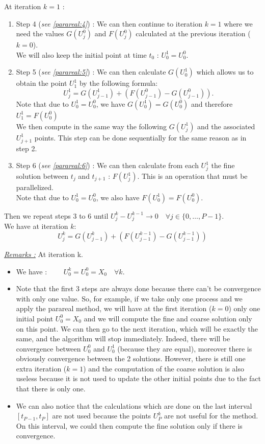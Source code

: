 \noindent At iteration $k=1$ :
\begin{enumerate}[label=\textbullet]	
	\item Step 4 (\textit{see \ref{parareal:4}}) : We can then continue to iteration $k=1$ where we need the values $G(U_j^0)$ and $F(U_j^0)$ calculated at the previous iteration ($k=0$). \\
	We will also keep the initial point at time $t_0$ : $U_0^1=U_0^0$.
	\item Step 5 (\textit{see \ref{parareal:5}}) : We can then calculate $G(U_0^1)$ which allows us to obtain the point $U_1^1$ by the following formula:
	$$U_j^1=G(U_{j-1}^1)+(F(U_{j-1}^0)-G(U_{j-1}^0)).$$
	Note that due to $U_0^1=U_0^0$, we have $G(U_0^1)=G(U_0^0)$ and therefore $U_1^1=F(U_0^0)$ \\
	We then compute in the same way the following $G(U_j^1)$ and the associated $U_{j+1}^1$ points. This step can be done sequentially for the same reason as in step 2.
	\item Step 6 (\textit{see \ref{parareal:6}}) : We can then calculate from each $U_j^1$ the fine solution between $t_j$ and $t_{j+1}$ : $F(U_j^1)$. This is an operation that must be parallelized. \\
	Note that due to $U_0^1=U_0^0$, we also have $F(U_0^1)=F(U_0^0)$.
\end{enumerate}

\noindent Then we repeat steps 3 to 6 until $U_j^k-U_j^{k-1}\rightarrow 0 \quad \forall j\in\{0,\dots,P-1\}$. \\
We have at iteration $k$:
$$U_j^k=G(U_{j-1}^k)+(F(U_{j-1}^{k-1})-G(U_{j-1}^{k-1}))$$

\noindent \underline{\textit{Remarks :}} At iteration k.
\begin{itemize}[label=-]
	\item We have : $\qquad U_0^k=U_0^0=X_0 \quad \forall k$.
	\item Note that the first 3 steps are always done because there can't be convergence with only one value. So, for example, if we take only one process and we apply the parareal method, we will have at the first iteration ($k=0$) only one initial point $U_0^0=X_0$ and we will compute the fine and coarse solution only on this point. We can then go to the next iteration, which will be exactly the same, and the algorithm will stop immediately. Indeed, there will be convergence between $U_0^0$ and $U_0^1$ (because they are equal), moreover there is obviously convergence between the 2 solutions. However, there is still one extra iteration ($k=1$) and the computation of the coarse solution is also useless because it is not used to update the other initial points due to the fact that there is only one.
	\item We can also notice that the calculations which are done on the last interval $[t_{P-1},t_P]$ are not used because the points $U_P^k$ are not useful for the method. On this interval, we could then compute the fine solution only if there is convergence.
\end{itemize}

